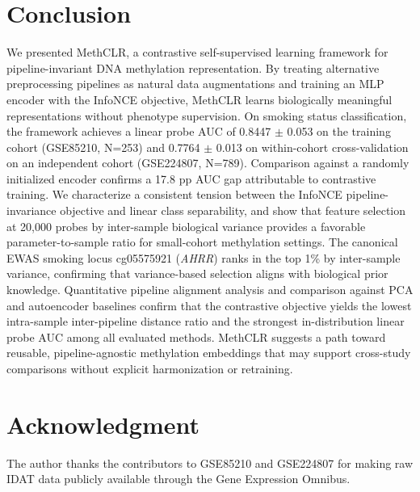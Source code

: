 \documentclass[conference]{IEEEtran}
\begin{document}
\section{Conclusion}

We presented MethCLR, a contrastive self-supervised learning framework for pipeline-invariant DNA methylation representation. By treating alternative preprocessing pipelines as natural data augmentations and training an MLP encoder with the InfoNCE objective, MethCLR learns biologically meaningful representations without phenotype supervision. On smoking status classification, the framework achieves a linear probe AUC of 0.8447 $\pm$ 0.053 on the training cohort (GSE85210, N=253) and 0.7764 $\pm$ 0.013 on within-cohort cross-validation on an independent cohort (GSE224807, N=789). Comparison against a randomly initialized encoder confirms a 17.8 pp AUC gap attributable to contrastive training. We characterize a consistent tension between the InfoNCE pipeline-invariance objective and linear class separability, and show that feature selection at 20,000 probes by inter-sample biological variance provides a favorable parameter-to-sample ratio for small-cohort methylation settings. The canonical EWAS smoking locus cg05575921 (\textit{AHRR}) ranks in the top 1\% by inter-sample variance, confirming that variance-based selection aligns with biological prior knowledge. Quantitative pipeline alignment analysis and comparison against PCA and autoencoder baselines confirm that the contrastive objective yields the lowest intra-sample inter-pipeline distance ratio and the strongest in-distribution linear probe AUC among all evaluated methods. MethCLR suggests a path toward reusable, pipeline-agnostic methylation embeddings that may support cross-study comparisons without explicit harmonization or retraining.

\section*{Acknowledgment}

The author thanks the contributors to GSE85210 and GSE224807 for making raw IDAT data publicly available through the Gene Expression Omnibus.
\end{document}
